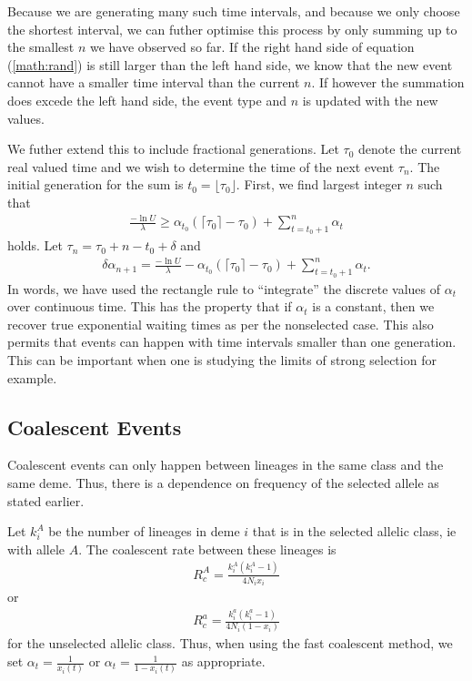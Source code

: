 \documentclass{article}
\begin{document}
Because we are generating many such time intervals, and because we only choose
the shortest interval, we can futher optimise this process by only summing up to
the smallest $n$ we have observed so far. If the right hand side of equation
(\ref{math:rand}) is still larger than the left hand side, we know that the new
event cannot have a smaller time interval than the current $n$. If however the
summation does excede the left hand side, the event type and $n$ is updated
with the new values. 

We futher extend this to include fractional generations. Let $\tau_0$ denote
the current real valued time and we wish to determine the time of the next event
$\tau_n$. The initial generation for the sum is $t_0=\lfloor \tau_0 \rfloor$.
First, we find largest integer $n$ such that 
\begin{align}
	\frac{-\ln U}{\lambda} \geq \alpha_{t_0}(\lceil \tau_0 \rceil
	-\tau_0)+\sum_{t=t_0+1}^{n} \alpha_t
\end{align}
holds. Let $\tau_n=\tau_0+n-t_0+\delta$ and 
\begin{align}
	\delta \alpha_{n+1}=\frac{-\ln U}{\lambda}-\alpha_{t_0}(\lceil \tau_0
	\rceil -\tau_0)+\sum_{t=t_0+1}^{n} \alpha_t.
\end{align}
In words, we have used the rectangle rule to ``integrate'' the discrete values
of $\alpha_t$ over continuous time. This has the property that if
$\alpha_t$ is a constant, then we recover true exponential waiting times as per
the nonselected case. This also permits that events can happen with time
intervals smaller than one generation. This can be important when one is
studying the limits of strong selection for example.   


\subsection{Coalescent Events}

Coalescent events can only happen between lineages in the same class and the
same deme. Thus, there is a dependence on frequency of the selected allele as
stated earlier.  

Let $k_i^A$ be the number of lineages in deme $i$ that is in the
selected allelic class, ie with allele $A$. The coalescent rate between these
lineages is 
\begin{align}
	R_c^A=\frac{k_i^A(k_i^A-1)}{4N_i x_i}
\end{align} 
or
\begin{align}
	R_c^a=\frac{k_i^a(k_i^a-1)}{4N_i (1-x_i)}
\end{align}
for the unselected allelic class. Thus, when using the fast coalescent method,
we set  $\alpha_t=\frac{1}{x_i(t)}$ or $\alpha_t=\frac{1}{1-x_i(t)}$ as
appropriate.
 
\end{document}
